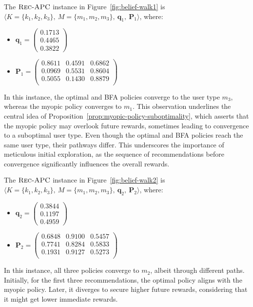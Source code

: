 \begin{example} \label{example:1}
The $\textsc{Rec-APC}$ instance in Figure~\ref{fig:belief-walk1} is $\langle K = \{ k_1, k_2, k_3 \},\ M = \{ m_1, m_2, m_3 \},\ \bm{q}_1,\ \bm{P}_1 \rangle$, where:
\begin{itemize}
\item $\bm{q}_1 = \begin{pmatrix} 0.1713 \\ 0.4465 \\ 0.3822 \end{pmatrix}$
\item $\bm{P}_1 = \begin{pmatrix} 0.8611 & 0.4591 & 0.6862 \\ 0.0969 & 0.5531 & 0.8604 \\ 0.5055 & 0.1430 & 0.8879 \\ \end{pmatrix}$
\end{itemize}
In this instance, the optimal and BFA policies converge to the user type $m_3$, whereas the myopic policy converges to $m_1$. This observation underlines the central idea of Proposition~\ref{prop:myopic-policy-suboptimality}, which asserts that the myopic policy may overlook future rewards, sometimes leading to convergence to a suboptimal user type. Even though the optimal and BFA policies reach the same user type, their pathways differ. This underscores the importance of meticulous initial exploration, as the sequence of recommendations before convergence significantly influences the overall rewards.
\end{example}

\begin{example} \label{example:2}
The $\textsc{Rec-APC}$ instance in Figure~\ref{fig:belief-walk2} is $\langle K = \{ k_1, k_2, k_3 \},\ M = \{ m_1, m_2, m_3 \},\ \bm{q}_2,\ \bm{P}_2 \rangle$, where:
\begin{itemize}
\item $\bm{q}_2 = \begin{pmatrix} 0.3844 \\ 0.1197 \\ 0.4959 \end{pmatrix}$
\item $\bm{P}_2 = \begin{pmatrix} 0.6848 & 0.9100 & 0.5457 \\ 0.7741 & 0.8284 & 0.5833 \\ 0.1931 & 0.9127 & 0.5273 \\ \end{pmatrix}$
\end{itemize}
In this instance, all three policies converge to $m_2$, albeit through different paths. Initially, for the first three recommendations, the optimal policy aligns with the myopic policy. Later, it diverges to secure higher future rewards, considering that it might get lower immediate rewards.
\end{example}

